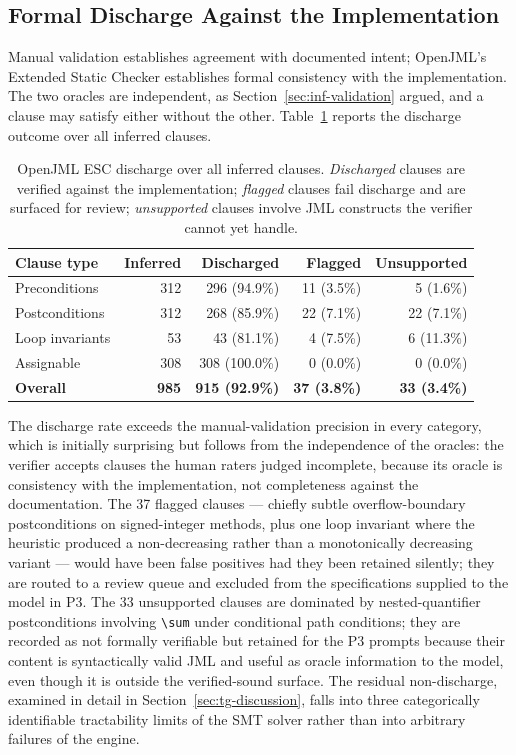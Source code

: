 \subsection{Formal Discharge Against the Implementation}

Manual validation establishes agreement with documented intent; OpenJML's
Extended Static Checker establishes formal consistency with the implementation.
The two oracles are independent, as Section~\ref{sec:inf-validation} argued, and
a clause may satisfy either without the other. Table~\ref{tab:tg-discharge}
reports the discharge outcome over all inferred clauses.

\begin{table}[ht]
\centering
\caption{OpenJML ESC discharge over all inferred clauses. \emph{Discharged}
clauses are verified against the implementation; \emph{flagged} clauses fail
discharge and are surfaced for review; \emph{unsupported} clauses involve JML
constructs the verifier cannot yet handle.}
\label{tab:tg-discharge}
\begin{tabular}{lrrrr}
\toprule
\textbf{Clause type} & \textbf{Inferred} & \textbf{Discharged} & \textbf{Flagged} & \textbf{Unsupported} \\
\midrule
Preconditions     & 312 & 296 (94.9\%) & 11 (3.5\%) &  5 (1.6\%) \\
Postconditions    & 312 & 268 (85.9\%) & 22 (7.1\%) & 22 (7.1\%) \\
Loop invariants   &  53 &  43 (81.1\%) &  4 (7.5\%) &  6 (11.3\%) \\
Assignable        & 308 & 308 (100.0\%) &  0 (0.0\%) &  0 (0.0\%) \\
\midrule
\textbf{Overall}  & \textbf{985} & \textbf{915 (92.9\%)} & \textbf{37 (3.8\%)} & \textbf{33 (3.4\%)} \\
\bottomrule
\end{tabular}
\end{table}

The discharge rate exceeds the manual-validation precision in every category,
which is initially surprising but follows from the independence of the oracles:
the verifier accepts clauses the human raters judged incomplete, because its
oracle is consistency with the implementation, not completeness against the
documentation. The 37 flagged clauses --- chiefly subtle overflow-boundary
postconditions on signed-integer methods, plus one loop invariant where the
heuristic produced a non-decreasing rather than a monotonically decreasing
variant --- would have been false positives had they been retained silently;
they are routed to a review queue and excluded from the specifications supplied
to the model in P3. The 33 unsupported clauses are dominated by nested-quantifier
postconditions involving \texttt{\textbackslash sum} under conditional path
conditions; they are recorded as not formally verifiable but retained for the
P3 prompts because their content is syntactically valid JML and useful as oracle
information to the model, even though it is outside the verified-sound surface.
The residual non-discharge, examined in detail in Section~\ref{sec:tg-discussion},
falls into three categorically identifiable tractability limits of the SMT
solver rather than into arbitrary failures of the engine.

